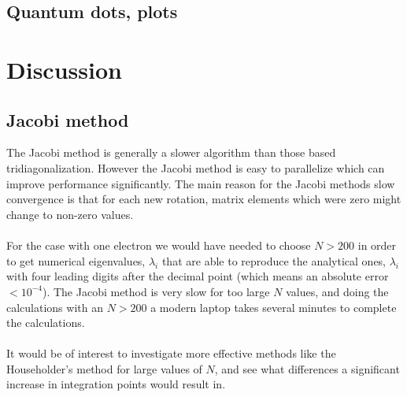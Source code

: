\documentclass[a4paper, fontsize=11pt]{article}
\begin{document}
\subsection{Quantum dots, plots}







\section{Discussion}
\subsection{Jacobi method}
The Jacobi method is generally a slower algorithm than those based tridiagonalization. However the Jacobi method is easy to parallelize which can improve performance significantly. The main reason for the Jacobi methods slow convergence is that for each new rotation, matrix elements which were zero might change to non-zero values.


\paragraph{}
For the case with one electron we would have needed to choose $N > 200$ in order to get numerical eigenvalues, $\hat{\lambda}_i$ that are able to reproduce the analytical ones, $\lambda_i$ with four leading digits after the decimal point (which means an absolute error $< 10^{-4}$). The Jacobi method is very slow for too large $N$ values, and doing the calculations with an $N > 200$ a modern laptop takes several minutes to complete the calculations. 

\paragraph{}
It would be of interest to investigate more effective methods like the Householder's method for large values of $N$, and see what differences a significant increase in integration points would result in.



\end{document}
